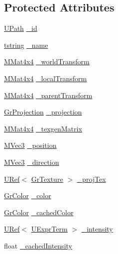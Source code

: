 \subsection*{Protected Attributes}
\begin{CompactItemize}
\item 
\hyperlink{class_u_path}{UPath} \hyperlink{class_gr_light_e62c43ff3876520d58328957f42d617b}{\_\-id}
\item 
\hyperlink{common__afx_8h_816fa58fd77499b0edb2c69ebe803d5c}{tstring} \hyperlink{class_gr_light_91326c4911f07bf038ba37567ee2d45a}{\_\-name}
\item 
\hyperlink{class_m_mat4x4}{MMat4x4} \hyperlink{class_gr_light_d5e7b0c00eb9f66d62bc5a45d0c4bbd1}{\_\-worldTransform}
\item 
\hyperlink{class_m_mat4x4}{MMat4x4} \hyperlink{class_gr_light_2a3bceb8640e0c14c1193b7e9e0f5dfb}{\_\-localTransform}
\item 
\hyperlink{class_m_mat4x4}{MMat4x4} \hyperlink{class_gr_light_abd86e7a88a4b1ad492f7042ccdf634b}{\_\-parentTransform}
\item 
\hyperlink{class_gr_projection}{GrProjection} \hyperlink{class_gr_light_a9c699d4b6090dc95a332abb6c6f525e}{\_\-projection}
\item 
\hyperlink{class_m_mat4x4}{MMat4x4} \hyperlink{class_gr_light_ba5ad710e4cff79152083a6919d607bb}{\_\-texgenMatrix}
\item 
\hyperlink{class_m_vec3}{MVec3} \hyperlink{class_gr_light_e3d31e4913c06cc34f2ea5ab47937ca2}{\_\-position}
\item 
\hyperlink{class_m_vec3}{MVec3} \hyperlink{class_gr_light_3913d6edaa0a232aea68b9878fe75ca0}{\_\-direction}
\item 
\hyperlink{class_u_ref}{URef}$<$ \hyperlink{class_gr_texture}{GrTexture} $>$ \hyperlink{class_gr_light_214aad662401b11c0d967dffd7c913dc}{\_\-projTex}
\item 
\hyperlink{class_gr_color}{GrColor} \hyperlink{class_gr_light_ba85bb3363501d63dfbd46adb583aaba}{\_\-color}
\item 
\hyperlink{class_gr_color}{GrColor} \hyperlink{class_gr_light_6c14df5bd91c6d8928ed198cc11424b5}{\_\-cachedColor}
\item 
\hyperlink{class_u_ref}{URef}$<$ \hyperlink{class_u_expr_term}{UExprTerm} $>$ \hyperlink{class_gr_light_17a6414681ade62467624a3149c3b499}{\_\-intensity}
\item 
float \hyperlink{class_gr_light_e8f05c795e23f3fdf3c19d741ca05249}{\_\-cachedIntensity}
\item 

\end{CompactItemize}
